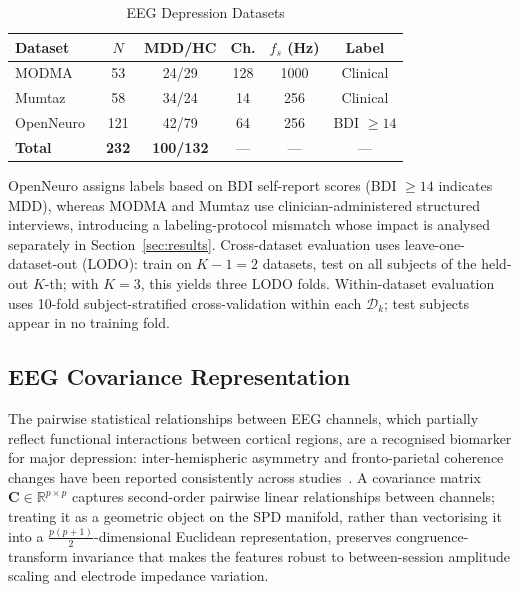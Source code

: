 \begin{table}[!t]
  \renewcommand{\arraystretch}{1.2}
  \caption{EEG Depression Datasets}
  \label{tab:datasets}
  \centering
  \begin{tabular}{lccccc}
    \toprule
    \textbf{Dataset} & \textbf{$N$} & \textbf{MDD/HC} & \textbf{Ch.}
      & \textbf{$f_s$ (Hz)} & \textbf{Label} \\
    \midrule
    MODMA~\cite{cai2022modma}             & 53  & 24/29  & 128 & 1000 & Clinical \\
    Mumtaz~\cite{mumtaz2016mdd}           & 58  & 34/24  & 14  & 256  & Clinical \\
    OpenNeuro~\cite{cavanagh2021openneuro} & 121 & 42/79 & 64  & 256  & BDI $\!\geq\!14$ \\
    \midrule
    \textbf{Total} & \textbf{232} & \textbf{100/132} & --- & --- & --- \\
    \bottomrule
  \end{tabular}
\end{table}

OpenNeuro assigns labels based on BDI self-report scores (BDI $\geq 14$ indicates
MDD), whereas MODMA and Mumtaz use clinician-administered structured interviews,
introducing a labeling-protocol mismatch whose impact is analysed separately in
Section~\ref{sec:results}.
Cross-dataset evaluation uses leave-one-dataset-out (LODO): train on $K\!-\!1\!=\!2$
datasets, test on all subjects of the held-out $K$-th; with $K\!=\!3$, this yields
three LODO folds.
Within-dataset evaluation uses 10-fold subject-stratified cross-validation within
each $\mathcal{D}_k$; test subjects appear in no training fold.

\subsection{EEG Covariance Representation}
\label{sec:cov}

The pairwise statistical relationships between EEG channels, which partially
reflect functional interactions between cortical regions, are a recognised
biomarker for major depression: inter-hemispheric asymmetry and fronto-parietal
coherence changes have been reported consistently across
studies~\cite{hosseinifard2013classifying,acharya2018automated}.
A covariance matrix $\mathbf{C}\in\mathbb{R}^{p\times p}$ captures
second-order pairwise linear relationships between channels; treating it as a
geometric object on the SPD manifold, rather than vectorising it into a
$\frac{p(p+1)}{2}$-dimensional Euclidean representation, preserves
congruence-transform invariance that makes the features robust to between-session
amplitude scaling and electrode impedance variation.

